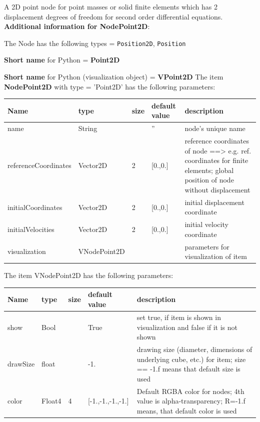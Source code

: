 \label{sec:item:NodePoint2D}
A 2D point node for point masses or solid finite elements which has 2 displacement degrees of freedom for second order differential equations.\vspace{12pt}
 \\{\bf Additional information for NodePoint2D}:
\bi
  \item The Node has the following types = \texttt{Position2D}, \texttt{Position}
  \item {\bf Short name} for Python = {\bf Point2D}  \item {\bf Short name} for Python (visualization object) = {\bf VPoint2D}\ei
\vspace{12pt} \noindent The item {\bf NodePoint2D} with type = 'Point2D' has the following parameters:\vspace{-1cm}\\ 
\begin{center}
  \footnotesize
  \begin{longtable}{| p{4.5cm} | p{2.5cm} | p{0.5cm} | p{2.5cm} | p{6cm} |}
    \hline
    \bf Name & \bf type & \bf size & \bf default value & \bf description \\ \hline
    name &     String &      &     '' &     node's unique name\\ \hline
    referenceCoordinates &     Vector2D &     2 &     [0.,0.] &     reference coordinates of node ==> e.g. ref. coordinates for finite elements; global position of node without displacement\\ \hline
    initialCoordinates &     Vector2D &     2 &     [0.,0.] &     initial displacement coordinate\\ \hline
    initialVelocities &     Vector2D &     2 &     [0.,0.] &     initial velocity coordinate\\ \hline
    visualization & VNodePoint2D & & & parameters for visualization of item \\ \hline
	  \end{longtable}
	\end{center}
The item VNodePoint2D has the following parameters:\vspace{-1cm}\\ 
\begin{center}
  \footnotesize
  \begin{longtable}{| p{4.5cm} | p{2.5cm} | p{0.5cm} | p{2.5cm} | p{6cm} |}
    \hline
    \bf Name & \bf type & \bf size & \bf default value & \bf description \\ \hline
    show &     Bool &      &     True &     set true, if item is shown in visualization and false if it is not shown\\ \hline
    drawSize &     float &      &     -1. &     drawing size (diameter, dimensions of underlying cube, etc.)  for item; size == -1.f means that default size is used\\ \hline
    color &     Float4 &     4 &     [-1.,-1.,-1.,-1.] &     Default RGBA color for nodes; 4th value is alpha-transparency; R=-1.f means, that default color is used\\ \hline
	  \end{longtable}
	\end{center}
